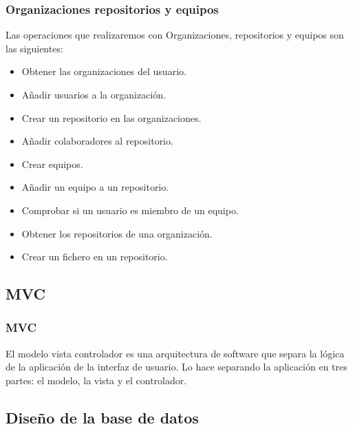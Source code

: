 \documentclass{beamer}
\begin{document}
\begin{frame}
\frametitle{Organizaciones repositorios y equipos}

  Las operaciones que realizaremos con Organizaciones, repositorios y equipos son las siguientes:

  \begin{itemize}
    \item Obtener las organizaciones del usuario.
    \item Añadir usuarios a la organización.
    \item Crear un repositorio en las organizaciones.
    \item Añadir colaboradores al repositorio.
    \item Crear equipos.
    \item Añadir un equipo a un repositorio.
    \item Comprobar si un usuario es miembro de un equipo.
    \item Obtener los repositorios de una organización.
    \item Crear un fichero en un repositorio.
  \end{itemize}

\end{frame}

  
\subsection{MVC}

\begin{frame}
\frametitle{MVC}

  El modelo vista controlador es una arquitectura de software que separa la lógica de
  la aplicación de la interfaz de usuario. Lo hace separando la aplicación en tres partes: 
  el modelo, la vista y el controlador.

\end{frame}


\subsection{Diseño de la base de datos}
\end{document}
